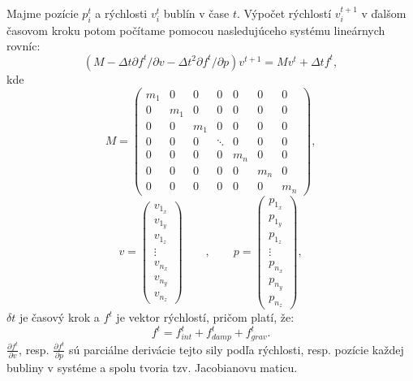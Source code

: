 \newpage

Majme pozície ${p_{i}^{t}}$ a rýchlosti ${v_{i}^{t}}$ bublín v čase $t$. Výpočet rýchlostí ${v_{i}^{t+1}}$ v ďalšom časovom kroku potom počítame pomocou nasledujúceho systému lineárnych rovníc:
\begin{equation}
	\label{eq:linear_equation_system}
	\left ( M - \Delta t\partial f^{t}/\partial v - \Delta t^{2}\partial f^{t}/\partial p \right )v^{t+1} = Mv^{t} + \Delta tf^{t},
\end{equation}
kde
\begin{equation}
	\label{eq:mass_matrix}
	M = \begin{pmatrix}
	m_{1} & 0 & 0 & 0 & 0 & 0 & 0\\ 
	0 & m_{1} & 0 & 0 & 0 & 0 & 0\\ 
	0 & 0 &  m_{1}& 0 & 0 & 0 & 0\\ 
	0 & 0 & 0 &  \ddots & 0 & 0 & 0\\ 
	0 & 0 & 0 & 0 &  m_{n}& 0 & 0\\ 
	0 & 0 & 0 & 0 & 0 &  m_{n}& 0\\ 
	0 & 0 & 0 & 0 & 0 & 0 & m_{n}
	\end{pmatrix},
\end{equation}
\begin{equation}
	\label{eq:velocities_and_positions_vectors}
	v = \begin{pmatrix}
	v_{1_{x}}\\ 
	v_{1_{y}}\\ 
	v_{1_{z}}\\ 
	\vdots \\ 
	v_{n_{x}}\\ 
	v_{n_{y}}\\ 
	v_{n_{z}}
	\end{pmatrix}
	\qquad,\qquad
	p = \begin{pmatrix}
	p_{1_{x}}\\ 
	p_{1_{y}}\\ 
	p_{1_{z}}\\ 
	\vdots \\ 
	p_{n_{x}}\\ 
	p_{n_{y}}\\ 
	p_{n_{z}}
	\end{pmatrix},
\end{equation}
$\delta t$ je časový krok a $f^{t}$ je vektor rýchlostí, pričom platí, že:
\begin{equation}
	\label{eq:total_force}
	f^{t} = f_{int}^{t} + f_{damp}^{t} + f_{grav}^{t}.
\end{equation}
$\frac{\partial f^{t}}{\partial v}$, resp. $\frac{\partial f^{t}}{\partial p}$ sú parciálne derivácie tejto sily podľa rýchlosti, resp. pozície každej bubliny v systéme a spolu tvoria tzv. Jacobianovu maticu.

